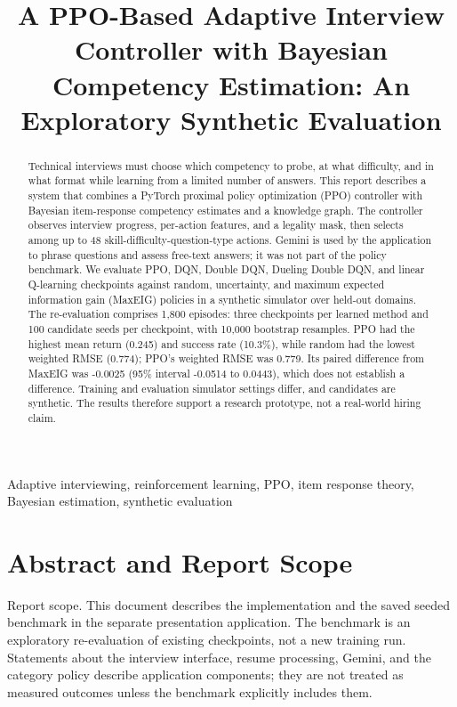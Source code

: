 \documentclass{ieeeaccess}
\begin{document}
\title{A PPO-Based Adaptive Interview Controller with Bayesian Competency Estimation: An Exploratory Synthetic Evaluation}

\author{}

\begin{abstract}Technical interviews must choose which competency to probe, at what difficulty, and in what format while learning from a limited number of answers. This report describes a system that combines a PyTorch proximal policy optimization (PPO) controller with Bayesian item-response competency estimates and a knowledge graph. The controller observes interview progress, per-action features, and a legality mask, then selects among up to 48 skill-difficulty-question-type actions. Gemini is used by the application to phrase questions and assess free-text answers; it was not part of the policy benchmark. We evaluate PPO, DQN, Double DQN, Dueling Double DQN, and linear Q-learning checkpoints against random, uncertainty, and maximum expected information gain (MaxEIG) policies in a synthetic simulator over held-out domains. The re-evaluation comprises 1,800 episodes: three checkpoints per learned method and 100 candidate seeds per checkpoint, with 10,000 bootstrap resamples. PPO had the highest mean return (0.245) and success rate (10.3\%), while random had the lowest weighted RMSE (0.774); PPO's weighted RMSE was 0.779. Its paired difference from MaxEIG was -0.0025 (95\% interval -0.0514 to 0.0443), which does not establish a difference. Training and evaluation simulator settings differ, and candidates are synthetic. The results therefore support a research prototype, not a real-world hiring claim.\end{abstract}

\begin{keywords}Adaptive interviewing, reinforcement learning, PPO, item response theory, Bayesian estimation, synthetic evaluation\end{keywords}

\maketitle

\section*{Abstract and Report Scope}

Report scope. This document describes the implementation and the saved seeded benchmark in the separate presentation application. The benchmark is an exploratory re-evaluation of existing checkpoints, not a new training run. Statements about the interview interface, resume processing, Gemini, and the category policy describe application components; they are not treated as measured outcomes unless the benchmark explicitly includes them.
\end{document}
